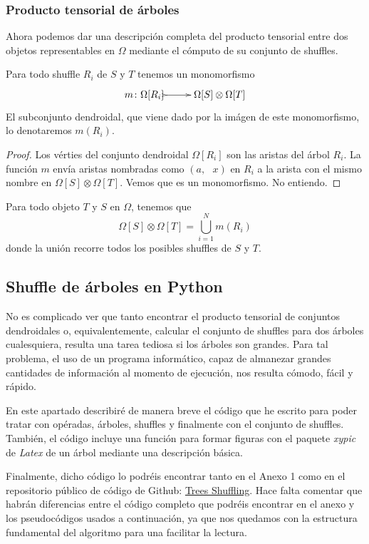 \documentclass[../main.tex]{subfiles}
\begin{document}
\subsubsection*{Producto tensorial de \'arboles}
Ahora podemos dar una descripci\'on completa del producto tensorial entre dos objetos representables en $\Omega$ mediante el c\'omputo de su conjunto de shuffles.
\begin{lema}
    Para todo shuffle $R_i$ de $S$ y $T$ tenemos un monomorfismo
    $$
        \xymatrix{
            m\colon\Omega[R_i] \ar@{>->}[r] & \Omega[S]\otimes\Omega[T]
        }
    $$
    El subconjunto dendroidal, que viene dado por la im\'agen de este monomorfismo, lo denotaremos $m(R_i)$.
\end{lema}
\begin{proof}
    Los v\'erties del conjunto dendroidal $\Omega[R_i]$ son las aristas del \'arbol $R_i$. La funci\'on $m$ env\'ia aristas nombradas como $(a,\text{ }x)$ en $R_i$ a la arista con el mismo nombre en $\Omega[S]\otimes\Omega[T]$.
    Vemos que es un monomorfismo.
    No entiendo.
\end{proof}
\begin{corol}
    Para todo objeto $T$ y $S$ en $\Omega$, tenemos que
    $$
        \Omega[S]\otimes\Omega[T] = \bigcup_{i=1}^{N} m(R_i)
    $$
    donde la uni\'on recorre todos los posibles shuffles de $S$ y $T$.
\end{corol}

\subsection{Shuffle de \'arboles en Python}
No es complicado ver que tanto encontrar el producto tensorial de conjuntos dendroidales o, equivalentemente, calcular el conjunto de shuffles para dos \'arboles cualesquiera, resulta una tarea tediosa si los \'arboles son grandes. Para tal problema, el uso de un programa inform\'atico, capaz de almanezar grandes cantidades de informaci\'on al momento de ejecuci\'on, nos resulta c\'omodo, f\'acil y r\'apido.

En este apartado describir\'e de manera breve el c\'odigo que he escrito para poder tratar con op\'eradas, \'arboles, shuffles y finalmente con el conjunto de shuffles. Tambi\'en, el c\'odigo incluye una funci\'on para formar figuras con el paquete \textit{xypic} de \textit{Latex} de un \'arbol mediante una descripci\'on b\'asica.

Finalmente, dicho c\'odigo lo podr\'eis encontrar tanto en el Anexo 1 como en el repositorio p\'ublico de c\'odigo de Github: \href{https://github.com/rbrasco/trees-shuffling}{Trees Shuffling}.
Hace falta comentar que habr\'an diferencias entre el c\'odigo completo que podr\'eis encontrar en el anexo y los pseudoc\'odigos usados a continuaci\'on, ya que nos quedamos con la estructura fundamental del algoritmo para una facilitar la lectura.
\end{document}
